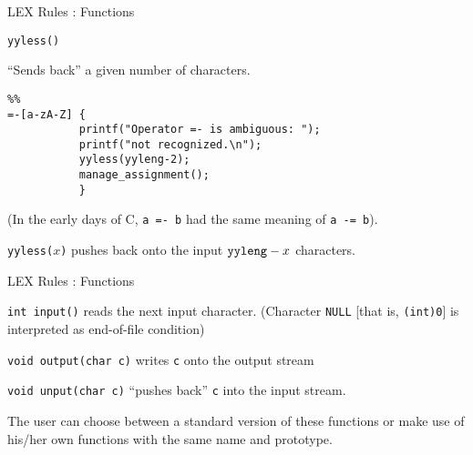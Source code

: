 \begin{frame}[fragile]{LEX Rules : Functions}

\begin{center}\tt yyless()\end{center}
``Sends back'' a given number of characters.


\vspace{20pt}

\begin{verbatim}
%%
=-[a-zA-Z] {
           printf("Operator =- is ambiguous: ");
           printf("not recognized.\n");
           yyless(yyleng-2);
           manage_assignment();
           }
\end{verbatim}


\vspace{20pt}

(In the early days of C, {\tt a =- b} had the same meaning of
{\tt a -= b}).


\vspace{20pt}

{\tt yyless($x$)} pushes back onto the input $\hbox{\tt yyleng}-x$ characters.



\end{frame}
\begin{frame}[fragile]{LEX Rules : Functions}

\begin{description}\item{\tt int input()} reads the next input character.
(Character {\tt NULL} [that is, {\tt (int)0}] is interpreted 
as end-of-file condition)
\item{\tt void output(char c)} writes {\tt c} onto the output stream
\item{\tt void unput(char c)} ``pushes back'' {\tt c} into the input stream.
\end{description}


\vspace{20pt}

The user can choose between a standard version of these functions
or make use of his/her own functions with the same name and
prototype.



\end{frame}

